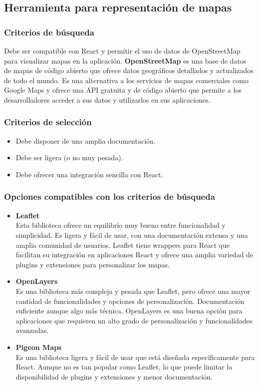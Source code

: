 \subsection{Herramienta para representación de mapas}
\subsubsection{Criterios de búsqueda}
Debe ser compatible con React y permitir el uso de datos de OpenStreetMap para visualizar mapas en la aplicación. \textbf{OpenStreetMap} es una base de datos de mapas de código abierto que ofrece datos geográficos detallados y actualizados de todo el mundo. Es una alternativa a los servicios de mapas comerciales como Google Maps y ofrece una API gratuita y de código abierto que permite a los desarrolladores acceder a sus datos y utilizarlos en sus aplicaciones\cite{openstreetmap_about}.

\subsubsection{Criterios de selección}
\begin{itemize}
    \item Debe disponer de una amplia documentación.
    \item Debe ser ligera (o no muy pesada).
    \item Debe ofrecer una integración sencilla con React.
\end{itemize}

\subsubsection{Opciones compatibles con los criterios de búsqueda}
\begin{itemize}
    \item \textbf{Leaflet}\\
        Esta biblioteca ofrece un equilibrio muy bueno entre funcionalidad y simplicidad. Es ligera y fácil de usar, con una documentación extensa y una amplia comunidad de usuarios. Leaflet tiene wrappers para React que facilitan su integración en aplicaciones React y ofrece una amplia variedad de plugins y extensiones para personalizar los mapas.
    \item \textbf{OpenLayers}\\
        Es una biblioteca más compleja y pesada que Leaflet, pero ofrece una mayor cantidad de funcionalidades y opciones de personalización. Documentación suficiente aunque algo más técnica. OpenLayers es una buena opción para aplicaciones que requieren un alto grado de personalización y funcionalidades avanzadas.
    \item \textbf{Pigeon Maps}\\
        Es una biblioteca ligera y fácil de usar que está diseñada específicamente para React. Aunque no es tan popular como Leaflet, lo que puede limitar la disponibilidad de plugins y extensiones y menor documentación.
\end{itemize}

